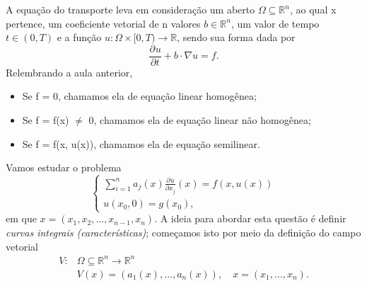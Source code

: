 \documentclass[../pde_notes.tex]{subfiles}
\begin{document}
\begin{example}
	A equação do transporte leva em consideração um aberto \(\Omega \subseteq \mathbb{R}^{n}\), ao qual x pertence, um coeficiente vetorial de n valores \(b\in \mathbb{R}^{n}\), um valor de tempo \(t\in (0, T)\) e a função \(u:\Omega \times [0, T)\rightarrow \mathbb{R}\), sendo sua forma dada por
	\[
		\frac{\partial^{}u}{\partial t^{}} + b \cdot \nabla u = f.
	\]
	Relembrando a aula anterior,
	\begin{itemize}
		\item Se f = 0, chamamos ela de equação linear homogênea;
		\item Se f = f(x) \(\neq\) 0, chamamos ela de equação linear não homogênea;
		\item Se f = f(x, u(x)), chamamos ela de equação semilinear.
	\end{itemize}
	Vamos estudar o problema
	\[
		\left\{\begin{array}{ll}
			\sum\limits_{i=1}^{n}a_{j}(x)\frac{\partial^{}u}{\partial x_{j}^{}}(x) = f(x, u(x)) \\
			u(x_{0}, 0) = g(x_{0}),
		\end{array}\right.
	\]
	em que \(x = (x_1, x_2, \dotsc , x_{n-1}, x_{n})\). A ideia para abordar esta questão é definir \textit{curvas integrais (características)}; começamos isto por meio da definição do campo vetorial
	\begin{align*}
		V: & \Omega \subseteq \mathbb{R}^{n}\rightarrow \mathbb{R}^{n}           \\
		   & V(x) = (a_1(x), \dotsc , a_{n}(x)),\quad x = (x_1, \dotsc , x_{n}).
	\end{align*}


\end{example}
\end{document}
